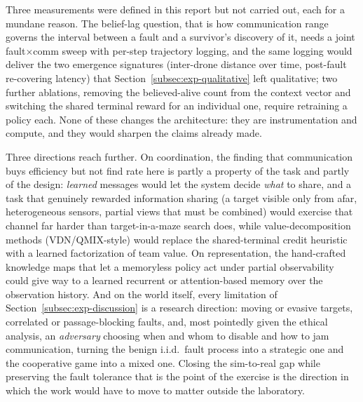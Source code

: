 Three measurements were defined in this report but not carried out, each for a
mundane reason. The belief-lag question, that is how communication range governs
the interval between a fault and a survivor's discovery of it, needs a joint
fault$\times$comm sweep with per-step trajectory logging, and the same logging
would deliver the two emergence signatures (inter-drone distance over time,
post-fault re-covering latency) that Section~\ref{subsec:exp-qualitative} left
qualitative; two further ablations, removing the believed-alive count from the
context vector and switching the shared terminal reward for an individual one,
require retraining a policy each. None of these changes the architecture: they
are instrumentation and compute, and they would sharpen the claims already made.

Three directions reach further. On coordination, the finding that communication
buys efficiency but not find rate here is partly a property of the task and
partly of the
design: \emph{learned} messages would let the system decide \emph{what} to share,
and a task that genuinely rewarded information sharing (a target visible only
from afar, heterogeneous sensors, partial views that must be combined) would
exercise that channel far harder than target-in-a-maze search does, while
value-decomposition methods (VDN/QMIX-style) would replace the shared-terminal
credit heuristic with a learned factorization of team value. On representation,
the hand-crafted knowledge maps that let a memoryless policy act under partial
observability could give way to a learned recurrent or attention-based memory
over the observation history. And on the world itself, every limitation of
Section~\ref{subsec:exp-discussion} is a research direction: moving or evasive
targets, correlated or passage-blocking faults, and, most pointedly given the
ethical analysis, an \emph{adversary} choosing when and whom to disable and how
to jam communication, turning the benign i.i.d.\ fault process into a strategic
one and the cooperative game into a mixed one. Closing the sim-to-real gap while
preserving the fault tolerance that is the point of the exercise is the direction
in which the work would have to move to matter outside the laboratory.

